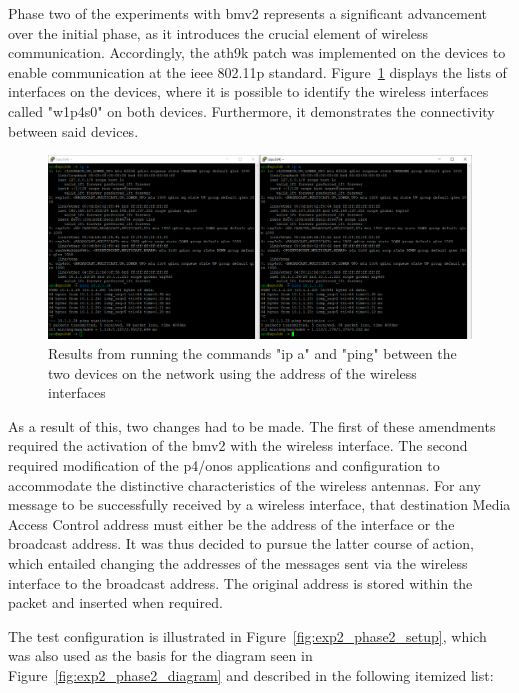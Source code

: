 Phase two of the experiments with \gls{bmv2} represents a significant advancement over the initial phase, as it introduces the crucial element of wireless communication. Accordingly, the ath9k patch was implemented on the devices to enable communication at the \gls{ieee} 802.11p standard. Figure~\ref{fig:exp2_phase2_wireless} displays the lists of interfaces on the devices, where it is possible to identify the wireless interfaces called "w1p4s0" on both devices. Furthermore, it demonstrates the connectivity between said devices.

\begin{figure}
	\centering
	\includegraphics[width=\textwidth]{Chapters/Figures/tests/bmv2_phase_2/wireless_config_&_connectivity.PNG}
	\caption{Results from running the commands "ip a" and "ping" between the two devices on the network using the  address of the wireless interfaces}
	\label{fig:exp2_phase2_wireless}
\end{figure}

As a result of this, two changes had to be made. The first of these amendments required the activation of the \gls{bmv2} with the wireless interface. The second required modification of the \gls{p4}/\gls{onos} applications and configuration to accommodate the distinctive characteristics of the wireless antennas. For any message to be successfully received by a wireless interface, that destination Media Access Control address must either be the address of the interface or the broadcast address. It was thus decided to pursue the latter course of action, which entailed changing the addresses of the messages sent via the wireless interface to the broadcast address. The original address is stored within the packet and inserted when required.

The test configuration is illustrated in Figure~\ref{fig:exp2_phase2_setup}, which was also used as the basis for the diagram seen in Figure~\ref{fig:exp2_phase2_diagram} and described in the following itemized list:

